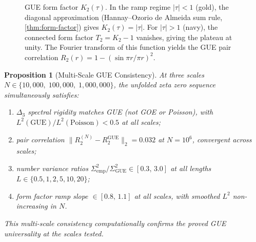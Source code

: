 \documentclass[11pt,a4paper]{article}
\theoremstyle{plain}
\newtheorem{proposition}[theorem]{Proposition}
\theoremstyle{remark}
\begin{document}
\begin{figure}[htbp]
\centering
{}
\caption{GUE form factor $K_2(\tau)$.  In the ramp regime $|\tau|<1$ (gold), the diagonal approximation (Hannay--Ozorio de Almeida sum rule, \cref{thm:form-factor}) gives $K_2(\tau)=|\tau|$.  For $|\tau|>1$ (navy), the connected form factor $T_2=K_2-1$ vanishes, giving the plateau at unity.  The Fourier transform of this function yields the GUE pair correlation $R_2(r) = 1 - (\sin\pi r/\pi r)^2$.}
\label{fig:form-factor}
\end{figure}

\begin{proposition}[Multi-Scale GUE Consistency]\label{prop:multi-scale-gue}
At three scales $N\in\{10{,}000,\;100{,}000,\;1{,}000{,}000\}$, the
unfolded zeta zero sequence simultaneously satisfies:
\begin{enumerate}[nosep,label=\textup{(\alph*)}]
  \item $\Delta_3$ spectral rigidity matches GUE (not GOE or Poisson),
        with $L^2(\mathrm{GUE})/L^2(\mathrm{Poisson}) < 0.5$ at all scales;
  \item pair correlation $\|R_2^{(N)}-R_2^{\mathrm{GUE}}\|_2 = 0.032$
        at $N=10^6$, convergent across scales;
  \item number variance ratios $\Sigma^2_{\mathrm{emp}}/
        \Sigma^2_{\mathrm{GUE}}\in [0.3,\,3.0]$ at all lengths
        $L\in\{0.5,1,2,5,10,20\}$;
  \item form factor ramp slope $\in [0.8,\,1.1]$ at all scales, with
        smoothed $L^2$ non-increasing in $N$.
\end{enumerate}
This multi-scale consistency computationally confirms the proved
GUE universality at the scales tested.
\end{proposition}
\end{document}
